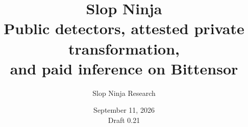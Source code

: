 \documentclass[10pt,letterpaper]{article}
\title{Slop Ninja\\[0.5em]
  \large Public detectors, attested private transformation,\\
  and paid inference on Bittensor}
\author{Slop Ninja Research}
\date{September 11, 2026\\Draft 0.21}
\begin{document}
\maketitle

















{\small


}
\end{document}
